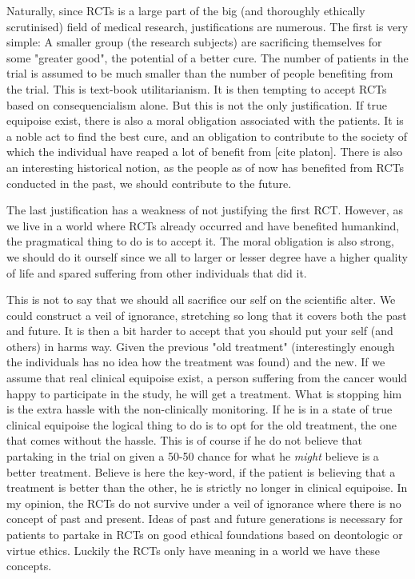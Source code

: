 \documentclass[12p]{article}
\begin{document}
Naturally, since RCTs is a large part of the big (and thoroughly ethically scrutinised) field of medical research, justifications are numerous.
The first is very simple:
A smaller group (the research subjects) are sacrificing themselves for some "greater good", the potential of a better cure.
The number of patients in the trial is assumed to be much smaller than the number of people benefiting from the trial.
This is text-book utilitarianism.%
It is then tempting to accept RCTs based on consequencialism alone.
But this is not the only justification.
If true equipoise exist, there is also a moral obligation associated with the patients.
It is a noble act to find the best cure, and an obligation to contribute to the society of which the individual have reaped a lot of benefit from [cite platon].
There is also an interesting historical notion, as the people as of now has benefited from RCTs conducted in the past, we should contribute to the future.

The last justification has a weakness of not justifying the first RCT.
However, as we live in a world where RCTs already occurred and have benefited humankind, the pragmatical thing to do is to accept it.
The moral obligation is also strong, we should do it ourself since we all to larger or lesser degree have a higher quality of life and spared suffering from other individuals that did it.

This is not to say that we should all sacrifice our self on the scientific alter.
We could construct a veil of ignorance, stretching so long that it covers both the past and future.
It is then a bit harder to accept that you should put your self (and others) in harms way.
Given the previous "old treatment" (interestingly enough the individuals has no idea how the treatment was found) and the new.
If we assume that real clinical equipoise exist, a person suffering from the cancer would happy to participate in the study, he will get a treatment.
What is stopping him is the extra hassle with the non-clinically monitoring.
If he is in a state of true clinical equipoise the logical thing to do is to opt for the old treatment, the one that comes without the hassle.
This is of course if he do not believe that partaking in the trial on given a 50-50 chance for what he \emph{might} believe is a better treatment.
Believe is here the key-word, if the patient is believing that a treatment is better than the other, he is strictly no longer in clinical equipoise.
In my opinion, the RCTs do not survive under a veil of ignorance where there is no concept of past and present.
Ideas of past and future generations is necessary for patients to partake in RCTs on good ethical foundations based on deontologic or virtue ethics.
Luckily the RCTs only have meaning in a world we have these concepts.
\end{document}
